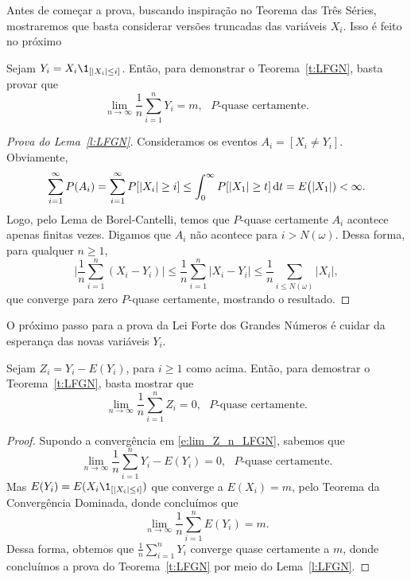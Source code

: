 \begin{topics}
Antes de começar a prova, buscando inspiração no Teorema das Três Séries, mostraremos que basta considerar versões truncadas das variáveis $X_i$.
Isso é feito no próximo

\begin{lemma}
  \label{l:LFGN}
  Sejam $Y_i = X_i \1_{[|X_i| \leq i]}$.
  Então, para demonstrar o Teorema~\ref{t:LFGN}, basta provar que
  \begin{equation}
    \lim_{n \to \infty}\frac{1}{n} \sum_{i=1}^n Y_i = m, \text{ $P$-quase certamente.}
  \end{equation}
\end{lemma}

\begin{proof}[Prova do Lema~\ref{l:LFGN}]
  Consideramos os eventos $A_i = [X_i \neq Y_i]$.
  Obviamente,
  \begin{equation}
  \sum_{i=1}^{\infty} P(A_i) = \sum_{i=1}^{\infty} P[|X_i| \geq i] \leq
  \int_0^\infty P[|X_1| \geq t] \mathop{}\!\mathrm{d} t = E\big(|X_1|) < \infty.
  \end{equation}
  Logo, pelo Lema de Borel-Cantelli, temos que $P$-quase certamente $A_i$ acontece apenas finitas vezes.
  Digamos que $A_i$ não acontece para $i > N(\omega)$.
  Dessa forma, para qualquer $n \geq 1$,
  \begin{equation}
    \Big|\frac{1}{n}\sum_{i=1}^n (X_i - Y_i)\Big| \leq \frac{1}{n}\sum_{i=1}^n |X_i - Y_i| \leq \frac{1}{n} \sum_{i \leq N(\omega)} |X_i|,
  \end{equation}
  que converge para zero $P$-quase certamente, mostrando o resultado.
\end{proof}

O próximo passo para a prova da Lei Forte dos Grandes Números é cuidar da esperança das novas variáveis $Y_i$.
\begin{lemma}
  \label{l:lim_Z_n_LFGN}
  Sejam $Z_i = Y_i - E(Y_i)$, para $i \geq 1$ como acima.
  Então, para demostrar o Teorema~\ref{t:LFGN}, basta mostrar que
  \begin{equation}
    \label{e:lim_Z_n_LFGN}
    \lim_{n \to \infty}\frac{1}{n} \sum_{i=1}^n Z_i = 0, \text{ $P$-quase certamente.}
  \end{equation}
\end{lemma}

\begin{proof}
  Supondo a convergência em \eqref{e:lim_Z_n_LFGN}, sabemos que
  \begin{equation}
    \lim_{n \to \infty} \frac{1}{n} \sum_{i=1}^n Y_i - E(Y_i) = 0, \text{ $P$-quase certamente.}
  \end{equation}
  Mas $E(Y_i) = E(X_i \1_{[|X_i| \leq i]})$ que converge a $E(X_i) = m$, pelo Teorema da Convergência Dominada, donde concluímos que
  \begin{equation}
    \lim_{n \to \infty} \frac{1}{n} \sum_{i=1}^n E(Y_i) = m.
  \end{equation}
  Dessa forma, obtemos que $\tfrac 1n \sum_{i=1}^n Y_i$ converge quase certamente a $m$, donde concluímos a prova do Teorema~\ref{t:LFGN} por meio do Lema~\ref{l:LFGN}.
\end{proof}


\end{topics}
